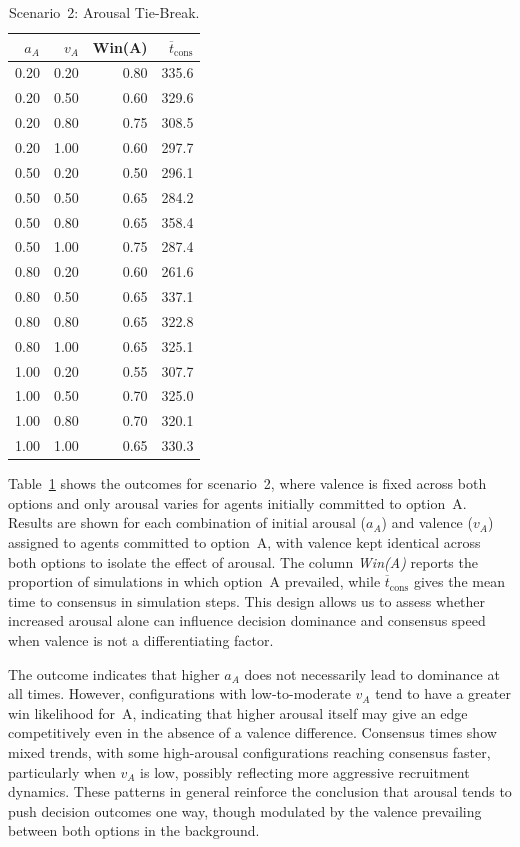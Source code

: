 \documentclass[a4paper,twoside]{article}
\begin{document}
\begin{table}[t]
\centering
\caption{Scenario~2: Arousal Tie-Break.}
\label{tab:sc2}
\begin{tabular}{rrr r}
\toprule
$a_A$ & $v_A$ & Win(A) & $\overline{t}_{\mathrm{cons}}$\\
\midrule
0.20 & 0.20 & 0.80 & 335.6\\
0.20 & 0.50 & 0.60 & 329.6\\
0.20 & 0.80 & 0.75 & 308.5\\
0.20 & 1.00 & 0.60 & 297.7\\
0.50 & 0.20 & 0.50 & 296.1\\
0.50 & 0.50 & 0.65 & 284.2\\
0.50 & 0.80 & 0.65 & 358.4\\
0.50 & 1.00 & 0.75 & 287.4\\
0.80 & 0.20 & 0.60 & 261.6\\
0.80 & 0.50 & 0.65 & 337.1\\
0.80 & 0.80 & 0.65 & 322.8\\
0.80 & 1.00 & 0.65 & 325.1\\
1.00 & 0.20 & 0.55 & 307.7\\
1.00 & 0.50 & 0.70 & 325.0\\
1.00 & 0.80 & 0.70 & 320.1\\
1.00 & 1.00 & 0.65 & 330.3\\
\bottomrule
\end{tabular}
\end{table}

\noindent
Table~\ref{tab:sc2} shows the outcomes for scenario~2, where valence is fixed across both options and only arousal varies for agents initially committed to option~A. Results are shown for each combination of initial arousal ($a_A$) and valence ($v_A$) assigned to agents committed to option~A, with valence kept identical across both options to isolate the effect of arousal. 
The column \emph{Win(A)} reports the proportion of simulations in which option~A prevailed, while $\overline{t}_{\mathrm{cons}}$ gives the mean time to consensus in simulation steps. 
This design allows us to assess whether increased arousal alone can influence decision dominance and consensus speed when valence is not a differentiating factor.

The outcome indicates that higher $a_A$ does not necessarily lead to dominance at all times. However, configurations with low-to-moderate $v_A$ tend to have a greater win likelihood for~A, indicating that higher arousal itself may give an edge competitively even in the absence of a valence difference. Consensus times show mixed trends, with some high-arousal configurations reaching consensus faster, particularly when $v_A$ is low, possibly reflecting more aggressive recruitment dynamics.
These patterns in general reinforce the conclusion that arousal tends to push decision outcomes one way, though modulated by the valence prevailing between both options in the background.
\end{document}
